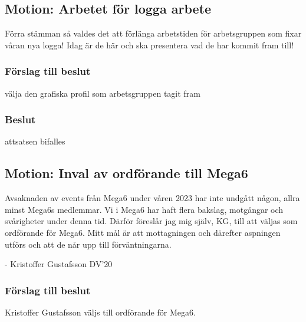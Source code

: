 \documentclass[protokoll]{dvd}
\begin{document}
\subsection{Motion: Arbetet för logga arbete}
Förra stämman så valdes det att förlänga arbetstiden för arbetsgruppen som fixar våran nya logga!
Idag är de här och ska presentera vad de har kommit fram till!
\subsubsection*{Förslag till beslut}
\begin{attsatser}
    \item välja den grafiska profil som arbetsgruppen tagit fram
\end{attsatser}
\subsubsection*{Beslut}
\begin{attsatser}
    \item attsatsen bifalles
\end{attsatser}

\subsection{Motion: Inval av ordförande till Mega6}
Avsaknaden av events från Mega6 under våren 2023 har inte undgått någon,
allra minst Mega6s medlemmar. Vi i Mega6 har haft flera bakslag, motgångar
och svårigheter under denna tid. Därför föreslår jag mig själv, KG,
till att väljas som ordförande för Mega6. Mitt mål är att mottagningen
och därefter aspningen utförs och att de når upp till förväntningarna.

- Kristoffer Gustafsson DV'20
\subsubsection*{Förslag till beslut}
\begin{attsatser}
    \item Kristoffer Gustafsson väljs till ordförande för Mega6.
\end{attsatser}
\end{document}
